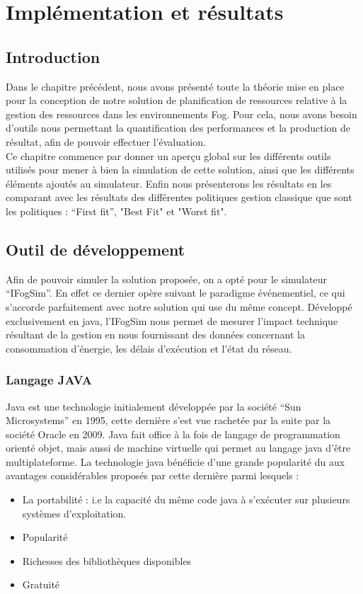 \chapter{Implémentation et résultats}
\section{Introduction}
Dans le chapitre précédent, nous avons présenté toute la théorie mise en place pour la conception de notre solution de planification de ressources relative à la gestion des ressources dans les environnements Fog. Pour cela, nous avons besoin d'outils nous permettant la quantification des performances et la production de résultat, afin de pouvoir effectuer l'évaluation.\\
Ce chapitre commence par donner un aperçu global sur les différents outils utilisés pour mener à bien la simulation de cette solution, ainsi que les différents éléments ajoutés au simulateur. Enfin nous présenterons les résultats en les comparant avec les résultats des différentes politiques gestion classique que sont les politiques : “First fit”, "Best Fit" et "Worst fit".\\
\section{Outil de développement}
Afin de pouvoir simuler la solution proposée, on a opté pour le simulateur “IFogSim”. En effet ce dernier opère suivant le paradigme événementiel, ce qui s’accorde parfaitement avec notre solution qui use du même concept. Développé exclusivement en java, l’IFogSim nous permet de mesurer l'impact technique résultant de la gestion en nous fournissant des données concernant la consommation d'énergie, les délais d'exécution et l’état du réseau.
\subsection{Langage JAVA}
Java est une technologie initialement développée par la société “Sun Microsystems” en 1995, cette dernière s'est vue rachetée par la suite par la société Oracle en 2009. Java fait office à la fois de langage de programmation orienté objet, mais aussi de machine virtuelle qui permet au langage java d'être multiplateforme. La technologie java bénéficie d’une grande popularité du aux avantages considérables proposés par cette dernière parmi lesquels :
\begin{itemize}
    \item La portabilité : i.e la capacité du même code java à s'exécuter sur plusieurs systèmes d’exploitation.
    \item Popularité
    \item Richesses des bibliothèques disponibles
    \item Gratuité 
\end{itemize}
